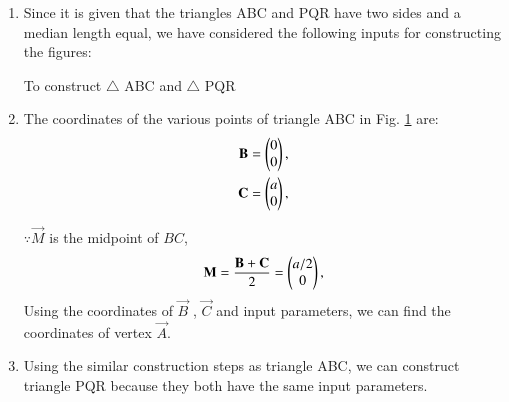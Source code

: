 \renewcommand{\theequation}{\theenumi}
\begin{enumerate}[label=\thesection.\arabic*.,ref=\thesection.\theenumi]

\begin{figure}[!ht]
\centering
\resizebox{\columnwidth}{!}{}
\caption{$\triangle ABC$ and $\triangle PQR$ by Latex-Tikz}
\label{fig:triangle_latex}	
\end{figure}
%
%
%
\item Since it is given that the triangles ABC and PQR have two sides and a median length equal, we have considered the following inputs for constructing the figures:
\\
%
\begin{table}[ht!]
\centering

\caption{To construct $\triangle $ ABC and $\triangle$ PQR}
\label{table:table1}	
\end{table}


\item The coordinates of the various points of triangle ABC in Fig. \ref{fig:triangle_latex} are:
\\
%
\begin{align}
\mathbf{B} &= \begin{pmatrix}0\\0\end{pmatrix} ,
\label{eq:constr_b}
\\
 \mathbf{C} &= \begin{pmatrix}a\\0\end{pmatrix}, 
\label{eq:constr_c}
\end{align}

$\because \vec{M}$ is the midpoint of $BC$,
\begin{align}
\mathbf{M}= \frac{\mathbf{B}+\mathbf{C}}{2} =\begin{pmatrix}a/2\\0\end{pmatrix},
\label{eq:constr_m}
\end{align}
Using the coordinates of $\vec{B}$ , $\vec{C}$ and input parameters, we can find the coordinates of vertex $\vec{A}$. 

\item Using the similar construction steps as triangle ABC, we can construct triangle PQR because they both have the same input parameters.


\end{enumerate}
